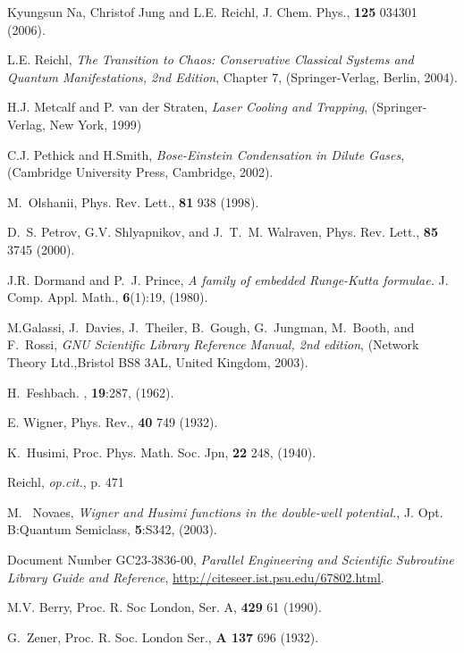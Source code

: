 \documentclass{article}
\begin{document}
\begin{thebibliography}{99}
Kyungsun Na, Christof Jung and L.E. Reichl,  J. Chem. Phys., {\bf 125} 034301 (2006).

L.E. Reichl,
{\em The Transition to Chaos:  Conservative Classical
Systems and Quantum Manifestations, 2nd Edition}, Chapter 7,
(Springer-Verlag, Berlin, 2004).

H.J. Metcalf and P. van der Straten,
{\em Laser Cooling and Trapping},
(Springer-Verlag, New York, 1999)

C.J. Pethick and H.Smith, 
{\em Bose-Einstein Condensation in Dilute Gases},
(Cambridge University Press, Cambridge,  2002).

M.~Olshanii, Phys. Rev. Lett., {\bf 81} 938  (1998).

D.~S. Petrov, G.V. Shlyapnikov, and J.~T.~M. Walraven, 
Phys. Rev. Lett., {\bf  85} 3745 (2000).

J.R. Dormand and P.~J. Prince, 
{\em A family of embedded Runge-Kutta formulae.} 
J. Comp. Appl. Math., {\bf 6}(1):19, (1980).

M.Galassi, J.~Davies, J.~Theiler, B.~Gough, G.~Jungman, M.~Booth, and F.~Rossi, 
{\em GNU Scientific Library Reference Manual,  2nd edition},
(Network Theory Ltd.,Bristol BS8 3AL, United Kingdom, 2003).

H.~Feshbach. , \textbf{19}:287, (1962).

E. Wigner, Phys. Rev., {\bf 40} 749 (1932).

K.~Husimi, Proc. Phys. Math. Soc. Jpn, {\bf 22} 248, (1940).

Reichl, \textit{op.cit.}, p. 471

M. ~Novaes,
{\em Wigner and Husimi functions in the double-well potential.},
J. Opt. B:Quantum Semiclass, {\bf 5}:S342, (2003).

Document Number GC23-3836-00,
{\em Parallel Engineering and Scientific Subroutine Library Guide and Reference},
\url{http://citeseer.ist.psu.edu/67802.html}.

M.V. Berry,  Proc. R. Soc London, Ser. A,  {\bf 429} 61 (1990).

G.~Zener, Proc. R. Soc. London Ser., {\bf A 137} 696 (1932).

\end {thebibliography}
\end{document}
